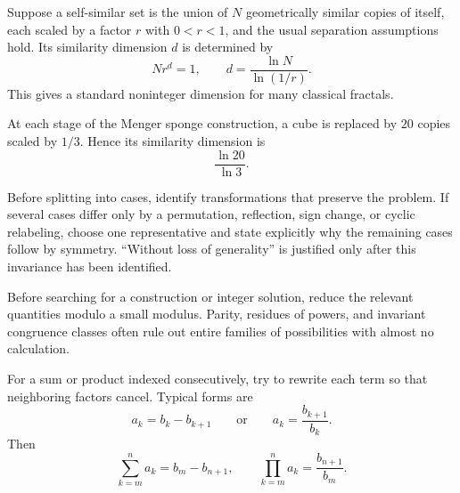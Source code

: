     \begin{definition}
        Suppose a self-similar set is the union of $N$ geometrically similar
        copies of itself, each scaled by a factor $r$ with $0<r<1$, and the
        usual separation assumptions hold. Its similarity dimension $d$ is
        determined by
        \[
            Nr^d=1,
            \qquad
            d=\frac{\ln N}{\ln(1/r)}.
        \]
        This gives a standard noninteger dimension for many classical fractals.
    \end{definition}

    \begin{fact}
        At each stage of the Menger sponge construction, a cube is replaced by
        $20$ copies scaled by $1/3$. Hence its similarity dimension is
        \[
            \boxed{\frac{\ln20}{\ln3}}.
        \]
    \end{fact}

    \begin{strategy}
        Before splitting into cases, identify transformations that preserve the
        problem. If several cases differ only by a permutation, reflection,
        sign change, or cyclic relabeling, choose one representative and state
        explicitly why the remaining cases follow by symmetry. ``Without loss
        of generality'' is justified only after this invariance has been
        identified.
    \end{strategy}

    \begin{strategy}
        Before searching for a construction or integer solution, reduce the
        relevant quantities modulo a small modulus. Parity, residues of powers,
        and invariant congruence classes often rule out entire families of
        possibilities with almost no calculation.
    \end{strategy}

    \begin{strategy}
        For a sum or product indexed consecutively, try to rewrite each term so
        that neighboring factors cancel. Typical forms are
        \[
            a_k=b_k-b_{k+1}
            \qquad\text{or}\qquad
            a_k=\frac{b_{k+1}}{b_k}.
        \]
        Then
        \[
            \sum_{k=m}^{n}a_k=b_m-b_{n+1},
            \qquad
            \prod_{k=m}^{n}a_k=\frac{b_{n+1}}{b_m}.
        \]
    \end{strategy}


